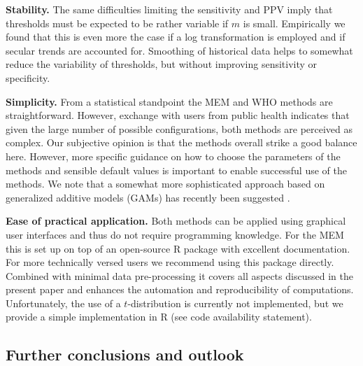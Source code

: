 \documentclass[12pt]{article}
\begin{document}
\begin{description}
\item \textbf{Stability.} The same difficulties limiting the sensitivity and PPV imply that thresholds must be expected to be rather variable if $m$ is small. Empirically we found that this is even more the case if a log transformation is employed and if secular trends are accounted for. Smoothing of historical data helps to somewhat reduce the variability of thresholds, but without improving sensitivity or specificity.
\item \textbf{Simplicity.} From a statistical standpoint the MEM and WHO methods are straightforward. However, exchange with users from public health indicates that given the large number of possible configurations, both methods are perceived as complex. Our subjective opinion is that the methods overall strike a good balance here. However, more specific guidance on how to choose the parameters of the methods and sensible default values is important to enable successful use of the methods. We note that a somewhat more sophisticated approach based on generalized additive models (GAMs) has recently been suggested \citep{Pang2023}.
\item \textbf{Ease of practical application.} Both methods can be applied using graphical user interfaces and thus do not require programming knowledge. For the MEM this is set up on top of an open-source R package with excellent documentation. For more technically versed users we recommend using this package directly. Combined with minimal data pre-processing it covers all aspects discussed in the present paper and enhances the automation and reproducibility of computations. Unfortunately, the use of a $t$-distribution is currently not implemented, but we provide a simple implementation in R (see code availability statement).
\end{description}

\subsection{Further conclusions and outlook}


\end{document}
